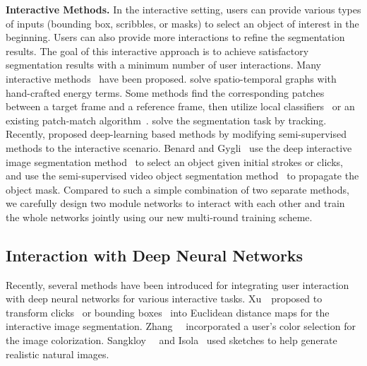 \documentclass[10pt,twocolumn,letterpaper]{article}
\renewcommand{\paragraph}[1]{\vspace{1mm}\noindent\textbf{#1}}
\begin{document}
\paragraph{Interactive Methods.} In the interactive setting, users can provide various types of inputs (\eg bounding box, scribbles, or masks) to select an object of interest in the beginning. 
Users can also provide more interactions to refine the segmentation results.
The goal of this interactive approach is to achieve satisfactory segmentation results with a minimum number of user interactions. 
Many interactive methods~\cite{wang2005interactive, price2009livecut, fan2015jumpcut, bai2009video, bratt2012rotoscoping, li2016roto++} have been proposed. 
\cite{wang2005interactive,price2009livecut,shankar2015video} solve spatio-temporal graphs with hand-crafted energy terms. 
Some methods find the corresponding patches between a target frame and a reference frame, then utilize local classifiers~\cite{bai2009video,zhong2012discontinuity} or an existing patch-match algorithm~\cite{fan2015jumpcut}. \cite{agarwala2004keyframe,li2016roto++} solve the segmentation task by tracking. 
Recently, \cite{benard2017interactive,caelles20182018} proposed deep-learning based methods by modifying semi-supervised methods to the interactive scenario. 
Benard and Gygli~\cite{benard2017interactive} use the deep interactive image segmentation method~\cite{xu2016deep} to select an object given initial strokes or clicks, and use the semi-supervised video object segmentation method~\cite{caelles2017one} to propagate the object mask.
Compared to such a simple combination of two separate methods, we carefully design two module networks to interact with each other and train the whole networks jointly using our new multi-round training scheme.




\subsection{Interaction with Deep Neural Networks}
Recently, several methods have been introduced for integrating user interaction with deep neural networks for various interactive tasks.
Xu~\etal~proposed to transform clicks~\cite{xu2016deep} or bounding boxes~\cite{xu2017deep} into Euclidean distance maps for the interactive image segmentation. Zhang~\etal~\cite{zhang2017real} incorporated a user's color selection for the image colorization. Sangkloy~\etal~\cite{sangkloy2017scribbler} and Isola~\etal\cite{isola2017image} used sketches to help generate realistic natural images. 
\end{document}
